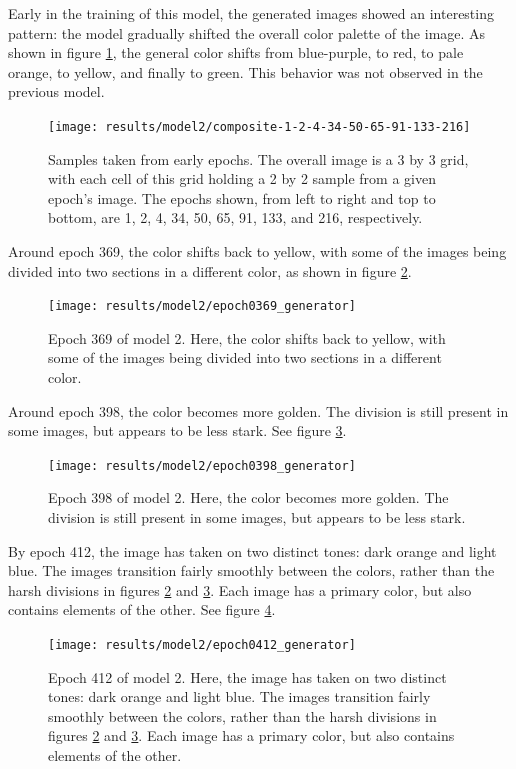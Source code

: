 \documentclass[11pt,letterpaper]{article}
\begin{document}
				Early in the training of this model, the generated images showed an interesting pattern: the model gradually shifted the overall color palette of the image.
				As shown in figure \ref{fig:cgvg:composite-1-2-4-34-50-65-91-133-216}, the general color shifts from blue-purple, to red, to pale orange, to yellow, and finally to green.
				This behavior was not observed in the previous model.
				\begin{figure}
					\centering
					\texttt{[image: results/model2/composite-1-2-4-34-50-65-91-133-216]}
					\caption[Samples of images from early epochs]{Samples taken from early epochs. The overall image is a 3 by 3 grid, with each cell of this grid holding a 2 by 2 sample from a given epoch's image. The epochs shown, from left to right and top to bottom, are 1, 2, 4, 34, 50, 65, 91, 133, and 216, respectively.}
					\label{fig:cgvg:composite-1-2-4-34-50-65-91-133-216}
				\end{figure}

				Around epoch 369, the color shifts back to yellow, with some of the images being divided into two sections in a different color, as shown in figure \ref{fig:cgvg:epoch0369generator}.
				\begin{figure}
					\centering
					\texttt{[image: results/model2/epoch0369\_generator]}
					\caption{Epoch 369 of model 2. Here, the color shifts back to yellow, with some of the images being divided into two sections in a different color.}
					\label{fig:cgvg:epoch0369generator}
				\end{figure}

				Around epoch 398, the color becomes more golden.
				The division is still present in some images, but appears to be less stark.
				See figure \ref{fig:cgvg:epoch0398generator}.
				\begin{figure}
					\centering
					\texttt{[image: results/model2/epoch0398\_generator]}
					\caption{Epoch 398 of model 2. Here, the color becomes more golden. The division is still present in some images, but appears to be less stark.}
					\label{fig:cgvg:epoch0398generator}
				\end{figure}

				By epoch 412, the image has taken on two distinct tones: dark orange and light blue.
				The images transition fairly smoothly between the colors, rather than the harsh divisions in figures \ref{fig:cgvg:epoch0369generator} and \ref{fig:cgvg:epoch0398generator}.
				Each image has a primary color, but also contains elements of the other.
				See figure \ref{fig:cgvg:epoch0412generator}.
				\begin{figure}
					\centering
					\texttt{[image: results/model2/epoch0412\_generator]}
					\caption{Epoch 412 of model 2. Here, the image has taken on two distinct tones: dark orange and light blue. The images transition fairly smoothly between the colors, rather than the harsh divisions in figures \ref{fig:cgvg:epoch0369generator} and \ref{fig:cgvg:epoch0398generator}. Each image has a primary color, but also contains elements of the other.}
					\label{fig:cgvg:epoch0412generator}
				\end{figure}
\end{document}
